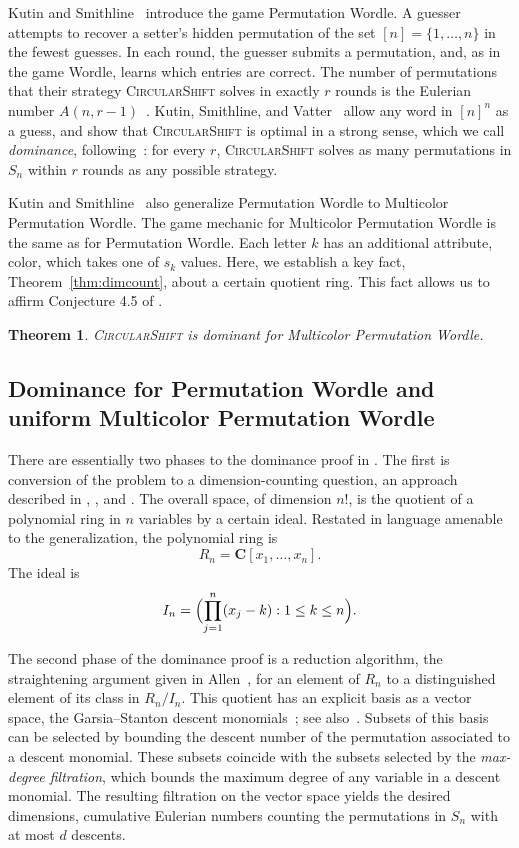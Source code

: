 \documentclass[12pt]{amsart}
\newtheorem{theorem}{Theorem}[section]
\theoremstyle{definition}
\theoremstyle{remark}
\newcommand\classic{Permutation Wordle\xspace}
\newcommand\rainbow{Multicolor Permutation Wordle\xspace}
\newcommand\basicstrat{\mbox{\textnormal{\textsc{CircularShift}}}\xspace}
\newcommand{\BC}{\mathbf C}
\newcommand\KSV{monthly-kutin-smithline-vatter}
\begin{document}
Kutin and Smithline~\cite{arxiv-kutin-smithline} introduce the game \classic.
  A guesser attempts to recover a setter's hidden permutation of
  the set $[n] = \{1, \ldots, n\}$ in the fewest guesses.  In each round,
  the guesser submits a permutation, and, as in the game Wordle,
  learns which entries are correct.
  The number of permutations that their strategy \basicstrat solves in
  exactly $r$ rounds is the Eulerian number
  $A(n, r-1)$~\cite[Thm.~3.5]{arxiv-kutin-smithline}.
  Kutin, Smithline, and Vatter~\cite{\KSV} allow any word in $[n]^n$
  as a guess, and show that \basicstrat is optimal in a strong sense, which 
  we call \emph{dominance}, following~\cite[\S7]{arxiv-kutin-smithline}: for 
  every $r$, \basicstrat solves as
  many permutations in $S_n$
  within $r$ rounds as any possible strategy.

  Kutin and Smithline~\cite{arxiv-kutin-smithline}
  also generalize \classic to \rainbow.  The game mechanic for \rainbow
  is the same as for \classic.  Each letter $k$ has an additional attribute,
    color, which takes one of $s_k$ values.  Here, we establish a key fact,
  Theorem~\ref{thm:dimcount}, about a certain quotient ring.
  This fact allows us to affirm Conjecture 4.5 of \cite{arxiv-kutin-smithline}.
  \begin{theorem}\label{thm:rainbow}
  \basicstrat is dominant for \rainbow.
  \end{theorem}

\subsection{Dominance for \classic and uniform \rainbow}\label{subsec:classic}

  There are essentially two phases to the dominance proof in
  \cite{\KSV}.
  The first is conversion of the problem to a dimension-counting question,
  an approach described in \cite{babai:linear-algebra-:},
  \cite{guth:polynomial-meth:}, and \cite{matouv-sek:thirty-three-mi:}.
  The overall space, of dimension $n!$, is the quotient of a
  polynomial ring in $n$ variables by a certain ideal.  Restated in
  language amenable to the generalization, the polynomial ring is
    \[R_n = \BC[x_1, \ldots, x_n].\] The ideal is
    \[I_n= \Bigl(\prod_{j = 1}^n (x_j - k): 1 \leq k \leq n\Bigr).\]

    The second phase of the dominance proof is a reduction
    algorithm, the straightening argument given in Allen~\cite[\S2]{allen:the-descent-mon},
    for an element of $R_n$ to a distinguished element of
    its class in $R_n / I_n$.
    This quotient has an explicit basis as a vector space, the
    Garsia--Stanton descent monomials~\cite[\S9]{garsia:group-actions-o:}; see also~\cite{garsia1980combinatorial}.
    Subsets of this basis can be selected by bounding the
    descent number of the permutation associated to a descent monomial.
    These subsets coincide with the subsets selected by
    the \emph{max-degree filtration}, 
    which bounds the maximum degree of any variable in a descent monomial.
    The resulting filtration on the vector space yields the desired
      dimensions, cumulative Eulerian numbers counting the
    permutations in $S_n$ with at most $d$ descents.
\end{document}
